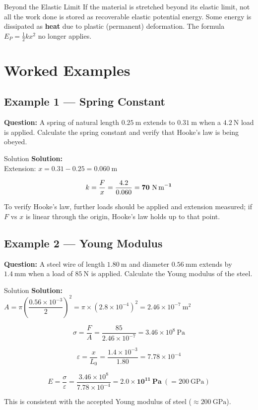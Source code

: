 \begin{warningbox}{Beyond the Elastic Limit}
If the material is stretched beyond its elastic limit, not all the work done is stored as recoverable elastic potential energy. Some energy is dissipated as \textbf{heat} due to plastic (permanent) deformation. The formula $E_P = \tfrac{1}{2}kx^2$ no longer applies.
\end{warningbox}

\pagebreak

\section{Worked Examples}

\subsection*{Example 1 — Spring Constant}

\textbf{Question:} A spring of natural length $0.25\ \text{m}$ extends to $0.31\ \text{m}$ when a $4.2\ \text{N}$ load is applied. Calculate the spring constant and verify that Hooke's law is being obeyed.

\begin{examplebox}{Solution}
\textbf{Solution:}\\
Extension: $x = 0.31 - 0.25 = 0.060\ \text{m}$

$$k = \frac{F}{x} = \frac{4.2}{0.060} = \mathbf{70\ \text{N\,m}^{-1}}$$

To verify Hooke's law, further loads should be applied and extension measured; if $F$ vs $x$ is linear through the origin, Hooke's law holds up to that point.
\end{examplebox}

\subsection*{Example 2 — Young Modulus}

\textbf{Question:} A steel wire of length $1.80\ \text{m}$ and diameter $0.56\ \text{mm}$ extends by $1.4\ \text{mm}$ when a load of $85\ \text{N}$ is applied. Calculate the Young modulus of the steel.

\begin{examplebox}{Solution}
\textbf{Solution:}\\
$A = \pi\left(\dfrac{0.56\times10^{-3}}{2}\right)^2 = \pi \times (2.8\times10^{-4})^2 = 2.46\times10^{-7}\ \text{m}^2$

$$\sigma = \frac{F}{A} = \frac{85}{2.46\times10^{-7}} = 3.46\times10^{8}\ \text{Pa}$$

$$\varepsilon = \frac{x}{L_0} = \frac{1.4\times10^{-3}}{1.80} = 7.78\times10^{-4}$$

$$E = \frac{\sigma}{\varepsilon} = \frac{3.46\times10^8}{7.78\times10^{-4}} = \mathbf{2.0\times10^{11}\ \text{Pa}}\ (= 200\ \text{GPa})$$

This is consistent with the accepted Young modulus of steel ($\approx 200\ \text{GPa}$).
\end{examplebox}

